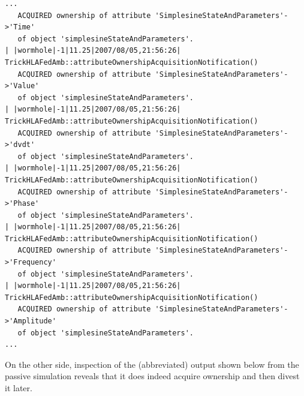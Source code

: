 \begin{lstlisting}[numbers=none,caption={Output stream from the active ownerhsip transfer simulation}]
...
   ACQUIRED ownership of attribute 'SimplesineStateAndParameters'->'Time'
   of object 'simplesineStateAndParameters'.
| |wormhole|-1|11.25|2007/08/05,21:56:26| TrickHLAFedAmb::attributeOwnershipAcquisitionNotification()
   ACQUIRED ownership of attribute 'SimplesineStateAndParameters'->'Value'
   of object 'simplesineStateAndParameters'.
| |wormhole|-1|11.25|2007/08/05,21:56:26| TrickHLAFedAmb::attributeOwnershipAcquisitionNotification()
   ACQUIRED ownership of attribute 'SimplesineStateAndParameters'->'dvdt'
   of object 'simplesineStateAndParameters'.
| |wormhole|-1|11.25|2007/08/05,21:56:26| TrickHLAFedAmb::attributeOwnershipAcquisitionNotification()
   ACQUIRED ownership of attribute 'SimplesineStateAndParameters'->'Phase'
   of object 'simplesineStateAndParameters'.
| |wormhole|-1|11.25|2007/08/05,21:56:26| TrickHLAFedAmb::attributeOwnershipAcquisitionNotification()
   ACQUIRED ownership of attribute 'SimplesineStateAndParameters'->'Frequency'
   of object 'simplesineStateAndParameters'.
| |wormhole|-1|11.25|2007/08/05,21:56:26| TrickHLAFedAmb::attributeOwnershipAcquisitionNotification()
   ACQUIRED ownership of attribute 'SimplesineStateAndParameters'->'Amplitude'
   of object 'simplesineStateAndParameters'.
...
\end{lstlisting}

On the other side,
inspection of the (abbreviated) output shown below from the passive simulation
reveals that it does indeed acquire ownership and then divest it later.

